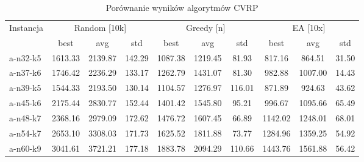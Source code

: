 \begin{table}[h!]
\centering
\caption{Porównanie wyników algorytmów CVRP}
\begin{tabular}{lccccccccc}
\hline
Instancja & \multicolumn{3}{c}{Random [10k]} & \multicolumn{3}{c}{Greedy [n]} & \multicolumn{3}{c}{EA [10x]}\\
& best & avg & std & best & avg & std & best & avg & std\\
\hline
a-n32-k5 & 1613.33 & 2139.87 & 142.29 & 1087.38 & 1219.45 & 81.93 & 817.16 & 864.51 & 31.50 \\
a-n37-k6 & 1746.42 & 2236.29 & 133.17 & 1262.79 & 1431.07 & 81.30 & 982.88 & 1007.00 & 14.43 \\
a-n39-k5 & 1544.33 & 2193.50 & 130.14 & 1104.57 & 1276.97 & 116.01 & 871.89 & 924.63 & 43.62 \\
a-n45-k6 & 2175.44 & 2830.77 & 152.44 & 1401.42 & 1545.80 & 95.21 & 996.67 & 1095.66 & 65.49 \\
a-n48-k7 & 2368.16 & 2979.09 & 172.62 & 1476.72 & 1607.45 & 66.89 & 1142.02 & 1248.01 & 68.01 \\
a-n54-k7 & 2653.10 & 3308.03 & 171.73 & 1625.52 & 1811.88 & 73.77 & 1284.96 & 1359.25 & 54.92 \\
a-n60-k9 & 3041.61 & 3721.21 & 177.18 & 1883.78 & 2094.29 & 110.66 & 1443.76 & 1561.88 & 56.42 \\
\hline
\end{tabular}
\end{table}